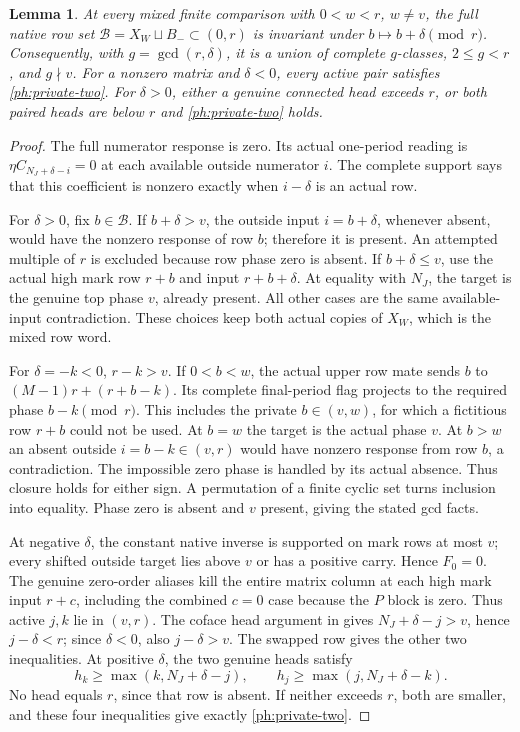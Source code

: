 \documentclass[11pt,a4paper]{amsart}
\numberwithin{equation}{section}
\theoremstyle{plain}
\newtheorem{lemma}[theorem]{Lemma}
\theoremstyle{definition}
\begin{document}
\begin{lemma}\label{ph:mixed-native}
At every mixed finite comparison with \(0<w<r\), \(w\ne v\), the full
native row set
\(\mathcal B=X_W\sqcup B_-\subset(0,r)\) is invariant under
\(b\mapsto b+\delta\pmod r\).
Consequently, with \(g=\gcd(r,\delta)\), it is a union of complete
\(g\)-classes, \(2\le g<r\), and \(g\nmid v\).
For a nonzero matrix and \(\delta<0\), every active pair satisfies
\eqref{ph:private-two}.
For \(\delta>0\), either a genuine connected head exceeds \(r\), or
both paired heads are below \(r\) and \eqref{ph:private-two} holds.
\end{lemma}
\begin{proof}
The full numerator response is zero.  Its actual one-period reading is
\(\eta C_{N_J+\delta-i}=0\) at each available outside numerator \(i\).
The complete support says that this coefficient is nonzero exactly
when \(i-\delta\) is an actual row.

For \(\delta>0\), fix \(b\in\mathcal B\).
If \(b+\delta>v\), the outside input \(i=b+\delta\), whenever absent,
would have the nonzero response of row \(b\); therefore it is present.
An attempted multiple of \(r\) is excluded because row phase zero is
absent.  If \(b+\delta\le v\), use the actual high mark row \(r+b\)
and input \(r+b+\delta\).  At equality with \(N_J\), the target is
the genuine top phase \(v\), already present.  All other cases are
the same available-input contradiction.  These choices keep both
actual copies of \(X_W\), which is the mixed row word.

For \(\delta=-k<0\), \(r-k>v\).
If \(0<b<w\), the actual upper row mate sends \(b\) to
\((M-1)r+(r+b-k)\).  Its complete final-period flag projects to the
required phase \(b-k\pmod r\).  This includes the private \(b\in(v,w)\),
for which a fictitious row \(r+b\) could not be used.
At \(b=w\) the target is the actual phase \(v\).
At \(b>w\) an absent outside \(i=b-k\in(v,r)\) would have nonzero
response from row \(b\), a contradiction.
The impossible zero phase is handled by its actual absence.
Thus closure holds for either sign.
A permutation of a finite cyclic set turns inclusion into equality.
Phase zero is absent and \(v\) present, giving the stated gcd facts.

At negative \(\delta\), the constant native inverse is supported on
mark rows at most \(v\); every shifted outside target lies above \(v\)
or has a positive carry.  Hence \(F_0=0\).
The genuine zero-order aliases kill the entire matrix column at each
high mark input \(r+c\), including the combined \(c=0\) case because
the \(P\) block is zero.  Thus active \(j,k\) lie in \((v,r)\).
The coface head argument in  gives
\(N_J+\delta-j>v\), hence \(j-\delta<r\); since \(\delta<0\),
also \(j-\delta>v\).  The swapped row gives the other two inequalities.
At positive \(\delta\), the two genuine heads satisfy
\[
 h_k\ge\max(k,N_J+\delta-j),\qquad
 h_j\ge\max(j,N_J+\delta-k).
\]
No head equals \(r\), since that row is absent.
If neither exceeds \(r\), both are smaller, and these four inequalities
give exactly \eqref{ph:private-two}.
\end{proof}
\end{document}
